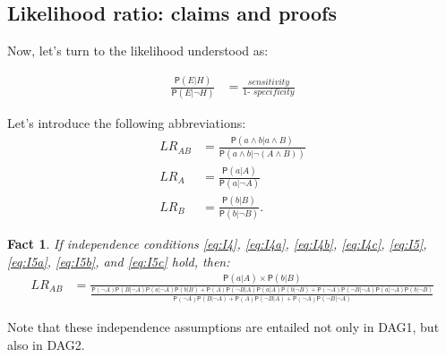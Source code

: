 \documentclass[
  10pt,
  dvipsnames,enabledeprecatedfontcommands]{scrartcl}
\newtheorem{fact}{Fact}
\newcommand{\n}{\neg}
\newcommand{\pr}[1]{\ensuremath{\mathsf{P}(#1)}}
\begin{document}
\hypertarget{likelihood-ratio-claims-and-proofs}{%
\subsection*{Likelihood ratio: claims and
proofs}\label{likelihood-ratio-claims-and-proofs}}

Now, let's turn to the likelihood understood as:

\begin{align*}
\frac{\pr{E \vert H}}{\pr{E \vert \neg H}} & =
\frac{\textit{sensitivity}}{\textit{1- specificity}}\end{align*}

\noindent Let's introduce the following abbreviations: \begin{align*}
LR_{AB} &= \frac{\pr{a\wedge b \vert a\wedge B}}{\pr{a \wedge b \vert \neg (A\wedge B)}}\\
LR_A & = \frac{\pr{a \vert A}}{\pr{a \vert \n A}} \\
LR_B & = \frac{\pr{b \vert B}}{\pr{b \vert \n B}}.
\end{align*}

\begin{fact} If independence conditions  \eqref{eq:I4}, \eqref{eq:I4a}, \eqref{eq:I4b},   \eqref{eq:I4c},  \eqref{eq:I5},   \eqref{eq:I5a},    \eqref{eq:I5b}, and   \eqref{eq:I5c}    hold, then:
\begin{align*}
LR_{AB} & =  \frac{\pr{a \vert A} \times \pr{b \vert B}}
 {\frac{\pr{\neg A}\pr{B \vert \neg A} \pr{a \vert \neg A}\pr{b \vert B} + \pr{A}\pr{\neg B \vert A} \pr{a \vert A }\pr{b \vert \neg B} + \pr{\neg A}\pr{\neg B \vert \neg A } \pr{a \vert \neg A}\pr{b \vert \neg B}}{\pr{\neg A}\pr{B \vert \neg A} + \pr{A}\pr{\neg B \vert A } + \pr{\neg A}\pr{\neg B \vert \neg A} }}
\end{align*}
\end{fact}

\noindent Note that these independence assumptions are entailed not only
in \textsf{DAG1}, but also in \textsf{DAG2}.
\end{document}
